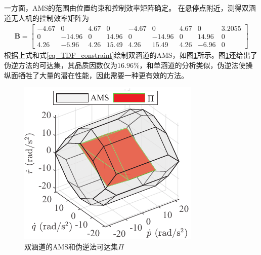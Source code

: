 一方面，AMS的范围由位置约束和控制效率矩阵确定\cite{Durham_2017}。 在悬停点附近，测得双涵道无人机的控制效率矩阵为
\begin{align}\bm{B}=
\begin{bmatrix}
-4.67 & 0 & 4.67 & 0 & -4.67 & 0 & 4.67 & 0 & 3.2055 \\
0 & -14.96 & 0 & 14.96 & 0 & -14.96 & 0 & 14.96 & 0 \\
4.26 & -6.96 & 4.26 & 15.49 & 4.26 & 15.49 & 4.26 & -6.96 & 0
\end{bmatrix}
\end{align}
根据上式和式\eqref{eq_TDF_constraint}绘制双涵道的AMS，如图\ref {TDF_AMS}所示。图\ref {TDF_AMS}还给出了伪逆方法的可达集，其品质因数仅为$16.96\%$，和单涵道的分析类似，伪逆法使操纵面牺牲了大量的潜在性能，因此需要一种更有效的方法。
\begin{figure}[htb]
	\centering
	\includegraphics[scale=1]{Fig/TDF_AMS.pdf}
	\caption{\label{TDF_AMS}双涵道的AMS和伪逆法可达集$\Pi$}
\end{figure}

